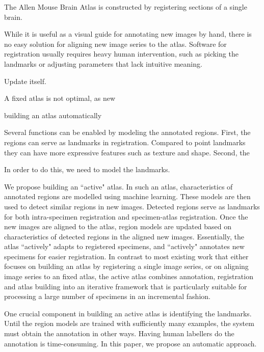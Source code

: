 \documentclass{llncs}
\begin{document}


The Allen Mouse Brain Atlas is constructed by registering sections of a single brain.

 While it is useful as a visual guide for annotating new images by hand, there is no easy solution for aligning new image series to the atlas. Software for registration usually requires heavy human intervention, such as picking the landmarks or adjusting parameters that lack intuitive meaning.


Update itself. 


A fixed atlas is not optimal, as new 

building an atlas automatically 

Several functions can be enabled by modeling the annotated regions. First, the regions can serve as landmarks in registration. Compared to point landmarks they can have more expressive features such as texture and shape. Second, the 


In order to do this, we need to model the landmarks. 

We propose building an ``active" atlas. In such an atlas, characteristics of annotated regions are modelled using machine learning. These models are then used to detect similar regions in new images. Detected regions serve as landmarks for both intra-specimen registration and specimen-atlas registration. Once the new images are aligned to the atlas, region models are updated based on characteristics of detected regions in the aligned new images. Essentially, the atlas ``actively" adapts to registered specimens, and ``actively" annotates new specimens for easier registration. In contrast to most existing work that either focuses on building an atlas by registering a single image series, or on aligning image series to an fixed atlas, the active atlas combines annotation, registration and atlas building into an iterative framework that is particularly suitable for processing a large number of specimens in an incremental fashion.


One crucial component in building an active atlas is identifying the landmarks. Until the region models are trained with sufficiently many examples, the system must obtain the annotation in other ways. Having human labellers do the annotation is time-consuming. In this paper, we propose an automatic approach.
\end{document}
